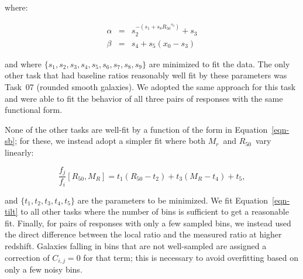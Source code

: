 \documentclass[useAMS,usenatbib]{mn2e}
\newcommand{\mr}{$M_r$}
\newcommand{\rfifty}{$R_{50}$}
\begin{document}
\noindent where:

\begin{eqnarray}
\alpha &=& s_2^{-\left(s_1 + s_8{R_{50}}^{s_9}\right)} + s_3 \\
\beta  &=& s_4 + s_5(x_0 - s_3)
\end{eqnarray}

\noindent and where $\{s_1,s_2,s_3,s_4,s_5,s_6,s_7,s_8,s_9\}$ are minimized to fit the data. The only other task that had baseline ratios reasonably well fit by these parameters was Task~07 (rounded smooth galaxies). We adopted the same approach for this task and were able to fit the behavior of all three pairs of responses with the same functional form. 

None of the other tasks are well-fit by a function of the form in Equation~\ref{eqn-sb}; for these, we instead adopt a simpler fit where both \mr~and \rfifty~vary linearly:

\begin{equation}
\frac{f_j}{f_i}[R_{50},M_R] = t_1(R_{50} - t_2) + t_3(M_R - t_4) + t_5,
\label{eqn-tilt}
\end{equation}

\noindent and $\{t_1,t_2,t_3,t_4,t_5\}$ are the parameters to be minimized. We fit Equation~\ref{eqn-tilt} to all other tasks where the number of bins is sufficient to get a reasonable fit. Finally, for pairs of responses with only a few sampled bins, we instead used the direct difference between the local ratio and the measured ratio at higher redshift. Galaxies falling in bins that are not well-sampled are assigned a correction of $C_{i,j}=0$ for that term; this is necessary to avoid overfitting based on only a few noisy bins. 


\end{document}
